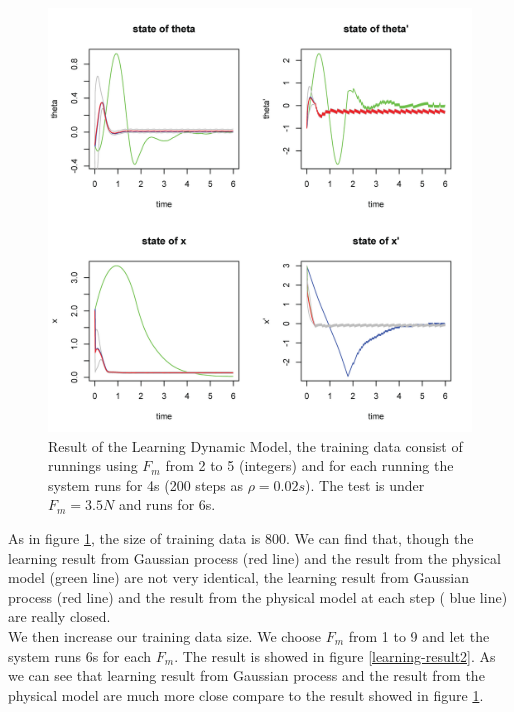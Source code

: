 \documentclass[11pt,twoside,a4paper]{article}
\begin{document}
\begin{figure}[!]
\centering
\includegraphics[width=14cm]{learning-result1.png}
\caption{Result of the Learning Dynamic Model, the training data
  consist of runnings using $F_m$ from 2 to 5 (integers) and for each
  running the system runs for 4s (200 steps as $\rho = 0.02s$). The
  test is under $F_m = 3.5N$ and runs for 6s.}
\label{learning-result1}
\end{figure}

As in figure \ref{learning-result1}, the size of training data is
800. We can find that, though the learning result from Gaussian
process ({\color{red}red line}) and the result from the physical model
({\color{green}green line}) are not very identical, the learning
result from Gaussian process ({\color{red}red line}) and the result
from the physical model at each step ({\color{blue} blue line}) are
really closed.\\

We then increase our training data size. We choose $F_m$ from 1 to 9
and let the system runs 6s for each $F_m$. The result is showed in
figure \ref{learning-result2}. As we can see that {\color{red}learning result} from
Gaussian process and the {\color{green}result} from the physical model
are much more close compare to the result showed in figure \ref{learning-result1}.\\
\end{document}
